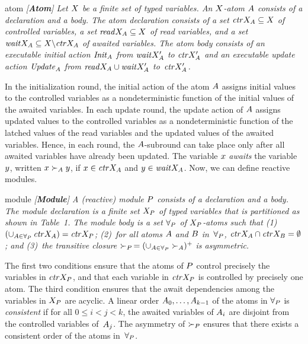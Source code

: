 \begin{definition}{atom}\it
  {\em [{\bf Atom}]}
  Let $X$ be a finite set of typed variables.
  An {\em $X$-atom\/} $A$ consists of a declaration and a body.
  The atom declaration consists of a set ${\it ctr}X_{A}\subseteq X$ of
  {\em controlled variables}, a set ${\it read}X_{A}\subseteq X$ of
  {\em read variables}, and a set
  ${\it wait}X_{A}\subseteq X\backslash{\it ctr}X_{A}$ of {\em awaited variables}.
  The atom body consists of an executable {\em initial action\/}
  ${\it Init}_{A}$ from ${\it wait}X_{A}'$ to ${\it ctr}X_{A}'$ and an executable
  {\em update action\/} ${\it Update}_{A}$ from
  ${\it read}X_{A}\cup{\it wait}X_{A}'$ to~${\it ctr}X_{A}'$.
\end{definition}

\mypar
In the initialization round, the initial action of the atom $A$ assigns
initial values to the controlled variables as a nondeterministic function of
the initial values of the awaited variables.
In each update round, the update action of $A$ assigns updated values to
the controlled variables as a nondeterministic function of the latched values
of the read variables and the updated values of the awaited variables.
Hence, in each round, the $A$-subround can take place only after all
awaited variables have already been updated.
The variable $x$ {\em awaits\/} the variable~$y$, written
$x\succ_Ay$, if $x\in{\it ctr}X_{A}$ and
$y\in{\it wait}X_{A}$.
Now, we can define reactive modules.

\begin{definition}{module}\it
  {\em [{\bf Module}]}
  A {\em (reactive) module\/} ${P}$ consists of a declaration and a body.
  The module declaration is a finite set $X_{{P}}$ of typed variables
  that is partitioned as shown in Table~1.
  The module body is a set $\forall_{{P}}$ of $X_{{P}}$-atoms such that
  (1)~$(\cup_{A\in\forall_{{P}}}\,{\it ctr}X_{A})={\it ctr}X_{{P}}$;
  (2)~for all atoms $A$ and $B$ in~$\forall_{{P}}$,
    ${\it ctr}X_{A}\cap{\it ctr}X_{B}=\emptyset$;
    and
  (3)~the transitive closure
    $\succ_{P}\,=(\cup_{A\in\forall_{{P}}}\succ_A)^+$ is
    asymmetric.
\end{definition}

\mypar
The first two conditions ensure that the atoms of ${P}$ control precisely the
variables in ${\it ctr}X_{{P}}$, and that each variable in ${\it ctr}X_{{P}}$ is
controlled by precisely one atom.
The third condition ensures that the await dependencies among the variables
in $X_{{P}}$ are acyclic.
A linear order $A_0,\ldots,A_{k-1}$ of the atoms in $\forall_{{P}}$
is {\em consistent\/} if for all $0\le i<j<k$, the awaited variables of
$A_i$ are disjoint from the controlled variables of~$A_j$.
The asymmetry of $\succ_{P}$ ensures that there exists a consistent order
of the atoms in~$\forall_{{P}}$.


